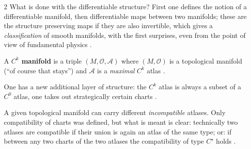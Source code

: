 \begin{paracol}{2}
What is done with the differentiable structure? First one defines the notion of a differentiable manifold, then differentiable maps between two manifolds; these are the structure preserving maps if they are also invertible, which gives a \emph{classification} of smooth manifolds, with the first surprises, even
from the point of view of fundamental physics .

\begin{definition}\label{def:df-manifold}
A \textbf{$C^k$ manifold} is a triple $(M,\mathcal O,\mathcal A)$ where $(M,\mathcal O)$ is a topological manifold (``of course that stays'') and $\mathcal A$ is a \emph{maximal} $C^k$ atlas .
\end{definition}
One has a new additional layer of structure: the $C^k$ atlas is always a subset of a $C^0$ atlas, one takes out strategically certain charts .

\begin{remark}\label{rem:df-incompat}
A given topological manifold can carry different \emph{incompatible} atlases. Only compatibility of charts was defined, but what is meant is clear: technically two atlases are compatible if their union is again an atlas of the same type; or: if between any two charts of the two atlases the
compatibility of type $C^\star$ holds .
\end{remark}


\end{paracol}
